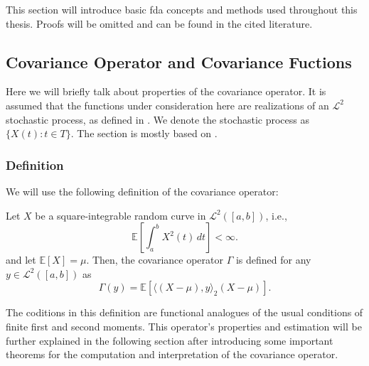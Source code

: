 This section will introduce basic fda concepts and methods used throughout this thesis.
Proofs will be omitted and can be found in the cited literature.

\subsection{Covariance Operator and Covariance Fuctions}
\label{sec:covs}
Here we will briefly talk about properties of the covariance operator. It is assumed
that the functions under consideration here are realizations of an $\mathcal{L}^2$
stochastic process, as defined in \textcite[Chapter~1.1.2]{Ash1975}. We denote the
stochastic process as $\{ X(t) : t \in T \}$. The section is mostly based on
\textcite[Chapter~2]{HorvathKokoszka2012}.

\subsubsection{Definition}
\label{sec:cov_def}
We will use the following definition of the covariance operator:
\begin{definition}
    \label{def:cov_operator}
    Let \( X \) be a square-integrable random curve in \( \mathcal{L}^2([a,b]) \), i.e.,
    \[
        \mathbb{E}\left[ \int_a^b X^2(t) \, dt \right] < \infty.
    \]
    and let \( \mathbb{E}[X] = \mu \). Then, the covariance operator \( \Gamma \) is defined for any \( y \in \mathcal{L}^2([a,b]) \) as
    \[
    \Gamma(y) = \mathbb{E}\left[ \langle (X-\mu), y \rangle_{2} (X-\mu) \right].
    \]
\end{definition}
The coditions in this definition are functional analogues of the usual conditions of
finite first and second moments. This operator's properties and estimation will be further explained
in the following section after introducing some important theorems for the computation
and interpretation of the covariance operator.
